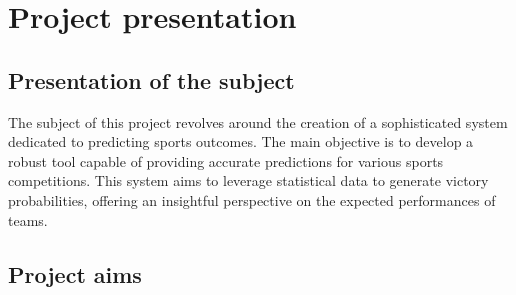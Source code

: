 \chapter{Project presentation}


\section{Presentation of the subject}

The subject of this project revolves around the creation of a sophisticated system dedicated to predicting sports outcomes. The main objective is to develop a robust tool capable of providing accurate predictions for various sports competitions. This system aims to leverage statistical data to generate victory probabilities, offering an insightful perspective on the expected performances of teams.

\section{Project aims}

